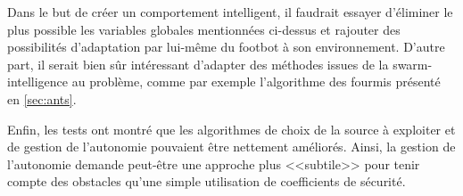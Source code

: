 Dans le but de créer un comportement intelligent, il faudrait essayer d'éliminer le plus possible les variables globales mentionnées ci-dessus et rajouter des possibilités d'adaptation par lui-même du footbot à son environnement. D'autre part, il serait bien sûr intéressant d'adapter des méthodes issues de la swarm-intelligence au problème, comme par exemple l'algorithme des fourmis présenté en \ref{sec:ants}.

Enfin, les tests ont montré que les algorithmes de choix de la source à exploiter et de gestion de l'autonomie pouvaient être nettement améliorés. Ainsi, la gestion de l'autonomie demande peut-être une approche plus <<subtile>> pour tenir compte des obstacles qu'une simple utilisation de coefficients de sécurité.
